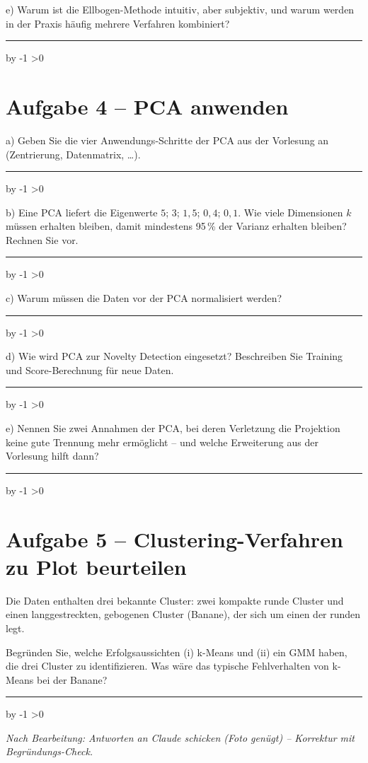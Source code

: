 \documentclass[10pt,a4paper]{article}
\newcommand{\antwortlinien}[1]{%
  \par\vspace{2pt}%
  \newcount\zeilen \zeilen=#1
  \loop
    \noindent\rule{\linewidth}{0.4pt}\par\vspace{11pt}%
    \advance\zeilen by -1
  \ifnum\zeilen>0 \repeat
}
\begin{document}
e) Warum ist die Ellbogen-Methode \glqq intuitiv, aber subjektiv\grqq, und warum werden
in der Praxis häufig mehrere Verfahren kombiniert?
\antwortlinien{2}

\section*{Aufgabe 4 -- PCA anwenden}

a) Geben Sie die vier Anwendungs-Schritte der PCA aus der Vorlesung an
(Zentrierung, Datenmatrix, \dots).
\antwortlinien{4}

b) Eine PCA liefert die Eigenwerte $5$; $3$; $1{,}5$; $0{,}4$; $0{,}1$.
Wie viele Dimensionen $k$ müssen erhalten bleiben, damit mindestens 95\,\% der Varianz
erhalten bleiben? Rechnen Sie vor.
\antwortlinien{3}

c) Warum müssen die Daten vor der PCA normalisiert werden?
\antwortlinien{2}

d) Wie wird PCA zur Novelty Detection eingesetzt? Beschreiben Sie Training und
Score-Berechnung für neue Daten.
\antwortlinien{4}

e) Nennen Sie zwei Annahmen der PCA, bei deren Verletzung die Projektion keine gute
Trennung mehr ermöglicht -- und welche Erweiterung aus der Vorlesung hilft dann?
\antwortlinien{3}

\section*{Aufgabe 5 -- Clustering-Verfahren zu Plot beurteilen}

Die Daten enthalten drei bekannte Cluster: zwei kompakte runde Cluster und einen
langgestreckten, gebogenen Cluster (\glqq Banane\grqq), der sich um einen der runden legt.

\begin{center}
\end{center}

Begründen Sie, welche Erfolgsaussichten (i) k-Means und (ii) ein GMM haben, die drei
Cluster zu identifizieren. Was wäre das typische Fehlverhalten von k-Means bei der Banane?

\antwortlinien{6}

\vspace{10pt}
\begin{center}
\footnotesize\itshape
Nach Bearbeitung: Antworten an Claude schicken (Foto genügt) -- Korrektur mit Begründungs-Check.
\end{center}
\end{document}
